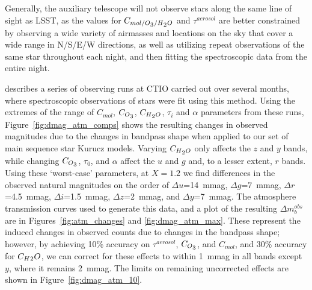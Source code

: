 \documentclass[12pt,preprint]{aastex}
\newcommand{\water}   {H\textsubscript{2}O}
\newcommand{\ozone}    {O\textsubscript{3}}
\begin{document}
Generally, the auxiliary telescope will not observe stars along the
same line of sight as LSST, as the values for
$C_{mol/\ozone/\water}$ and $\tau^{aerosol}$ are better
constrained by observing a wide variety of airmasses and locations on
the sky that cover a wide range in N/S/E/W directions, as well as utilizing
repeat observations of the same star throughout each night, and then
fitting the spectroscopic data from the entire night. 

\citet{Burke2010b} describes a series of observing runs at CTIO carried out over several
months, where spectroscopic observations of stars were fit using this method. Using the extremes of the range of $C_{mol}$,
$C_{\ozone}$, $C_{\water}$, $\tau_i$ and $\alpha$ parameters from these runs,
Figure~\ref{fig:dmag_atm_comps} shows the resulting changes in
observed magnitudes due to the changes in bandpass shape when applied
to our set of main sequence star Kurucz models. Varying
$C_{\water}$ only affects the $z$ and $y$ bands, while changing $C_{\ozone}$,
$\tau_0$, and $\alpha$ affect the $u$ and $g$ and, to a lesser extent, $r$
bands. Using these `worst-case' parameters, at $X=1.2$ we find
differences in the observed natural magnitudes on the order of $\Delta u$=14~mmag, $\Delta g$=7~mmag, $\Delta r$=4.5~mmag,
$\Delta i$=1.5~mmag, $\Delta z$=2~mmag, and $\Delta y$=7~mmag. The 
atmosphere transmission curves used to generate this data, and a plot
of the resulting $\Delta m_b^{obs}$ are in Figures~\ref{fig:atm_changes}
and \ref{fig:dmag_atm_max}.  These represent the induced changes in
observed counts due to changes in the bandpass shape; however, by
achieving 10\% accuracy on $\tau^{aerosol}$, $C_{\ozone}$, and
$C_{mol}$, and 30\% accuracy for $C_\water$, we can correct for
these effects to within 1~mmag in all bands except $y$, where it
remains 2~mmag. The limits on remaining uncorrected effects are shown in Figure~\ref{fig:dmag_atm_10}. 
\end{document}
